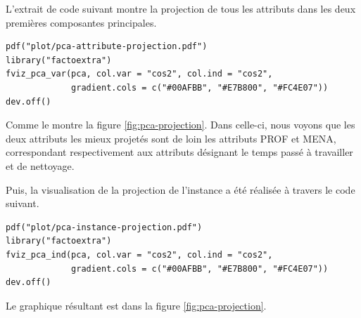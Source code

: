 \documentclass[11pt]{article}
\begin{document}
L'extrait de code suivant montre la projection de tous les attributs dans les
deux premières composantes principales.
\begin{verbatim}
pdf("plot/pca-attribute-projection.pdf")
library("factoextra")
fviz_pca_var(pca, col.var = "cos2", col.ind = "cos2",
             gradient.cols = c("#00AFBB", "#E7B800", "#FC4E07"))
dev.off()
\end{verbatim}
Comme le montre la figure \ref{fig:pca-projection}. Dans celle-ci,
nous voyons que les deux attributs les mieux projetés sont de loin les attributs
PROF et MENA, correspondant respectivement aux attributs désignant le temps
passé à travailler et de nettoyage.\par Puis, la visualisation de la projection de
l'instance a été réalisée à travers le code suivant.
\begin{verbatim}
pdf("plot/pca-instance-projection.pdf")
library("factoextra")
fviz_pca_ind(pca, col.var = "cos2", col.ind = "cos2",
             gradient.cols = c("#00AFBB", "#E7B800", "#FC4E07"))
dev.off()  
\end{verbatim}
Le graphique résultant est dans la figure \ref{fig:pca-projection}.
\end{document}

